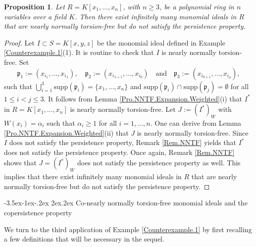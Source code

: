 \documentclass[11pt]{amsart}
\makeatletter
\newtheorem{proposition}[theorem]{Proposition}
\def\subsection{\@startsection{subsection}{2}{\z@}%
  {-3.5ex\@plus -1ex\@minus -.2ex}%
  {2ex\@plus .2ex}%
  {\normalfont\bfseries}}
\makeatother
\begin{document}
     
     
 \begin{proposition}\label{Pro.NNTF}
 Let $R=K[x_1,\ldots,x_n]$, with $n\geq 3$, be a polynomial ring in
$n$ variables over a field $K$. Then there exist infinitely many monomial
ideals in $R$ that are nearly normally torsion-free but do not satisfy the
persistence property.
 \end{proposition}
 
 \begin{proof}
  Let $I\subset S=K[x,y,z]$ be the monomial ideal defined in Example \ref{Counterexample.1}(1). It is routine to check that $I$ is nearly normally torsion-free. 
 Set    $$\mathfrak{p}_1:=(x_{i_1}, \ldots, x_{i_\lambda}), \quad  \mathfrak{p}_2:=(x_{i_{\lambda+1}}, \ldots, x_{i_\theta}) \quad  
  \text{and} \quad  \mathfrak{p}_3:=(x_{i_{\theta+1}}, \ldots, x_{i_\rho}),$$   such that 
   $\bigcup_{i=1}^3\mathrm{supp}(\mathfrak{p}_i)=\{x_1, \ldots, x_n\}$ and   $\mathrm{supp}(\mathfrak{p}_i) \cap    \mathrm{supp}(\mathfrak{p}_j)=\emptyset$  for all $1\leq i < j\leq 3$.  It follows from Lemma  \ref{Pro.NNTF.Expansion.Weighted}(i) that  $I^*$ in $R=K[x_1, \ldots, x_n]$ is nearly normally torsion-free. Let   $J:=(I^*)_W$ with $W(x_i)=\alpha_i$ such that $\alpha_i \geq 1$ for all $i=1, \ldots, n$.  
   One can derive from Lemma  \ref{Pro.NNTF.Expansion.Weighted}(ii) that   $J$ is nearly normally torsion-free.  
   Since $I$ does not satisfy the persistence property, Remark \ref{Rem.NNTF} yields that $I^*$ does not satisfy the persistence property. 
  Once again, Remark \ref{Rem.NNTF}  shows that  $J=(I^*)_W$ does not satisfy the persistence property as well.   This implies that   there exist infinitely many monomial
ideals in $R$ that are nearly normally torsion-free but do not satisfy the persistence property.
 \end{proof}
 
 
 
 \subsection{Co-nearly normally torsion-free monomial ideals and the  copersistence property} 
 
  We turn to the third application of Example \ref{Counterexample.1} by first recalling a few definitions that will be necessary  in the sequel.
\end{document}
